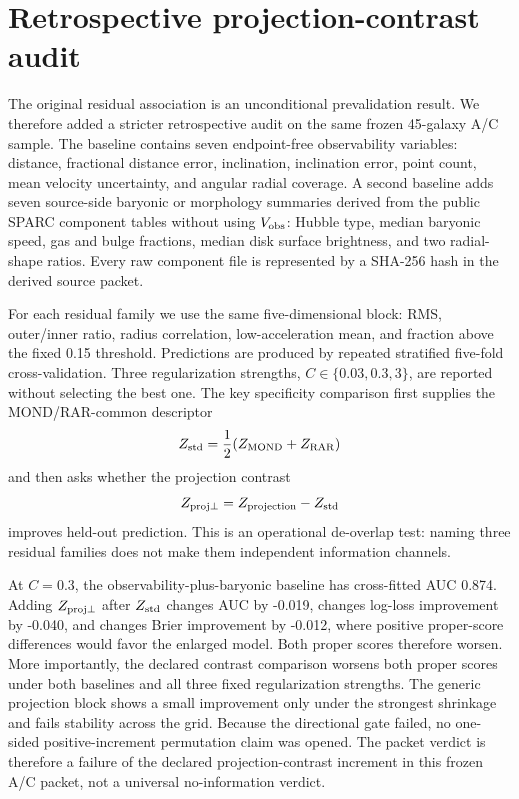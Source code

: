 \documentclass[11pt]{article}
\begin{document}
\section{Retrospective projection-contrast audit}

The original residual association is an unconditional prevalidation result. We therefore added a stricter retrospective audit on the same frozen 45-galaxy A/C sample. The baseline contains seven endpoint-free observability variables: distance, fractional distance error, inclination, inclination error, point count, mean velocity uncertainty, and angular radial coverage. A second baseline adds seven source-side baryonic or morphology summaries derived from the public SPARC component tables without using $V_{\rm obs}$: Hubble type, median baryonic speed, gas and bulge fractions, median disk surface brightness, and two radial-shape ratios. Every raw component file is represented by a SHA-256 hash in the derived source packet.

For each residual family we use the same five-dimensional block: RMS, outer/inner ratio, radius correlation, low-acceleration mean, and fraction above the fixed 0.15 threshold. Predictions are produced by repeated stratified five-fold cross-validation. Three regularization strengths, $C\in\{0.03,0.3,3\}$, are reported without selecting the best one. The key specificity comparison first supplies the MOND/RAR-common descriptor
\[
Z_{\rm std}=\frac{1}{2}(Z_{\rm MOND}+Z_{\rm RAR})
\]
and then asks whether the projection contrast
\[
Z_{\rm proj\perp}=Z_{\rm projection}-Z_{\rm std}
\]
improves held-out prediction. This is an operational de-overlap test: naming three residual families does not make them independent information channels.

At $C=0.3$, the observability-plus-baryonic baseline has cross-fitted AUC 0.874. Adding $Z_{\rm proj\perp}$ after $Z_{\rm std}$ changes AUC by -0.019, changes log-loss improvement by -0.040, and changes Brier improvement by -0.012, where positive proper-score differences would favor the enlarged model. Both proper scores therefore worsen. More importantly, the declared contrast comparison worsens both proper scores under both baselines and all three fixed regularization strengths. The generic projection block shows a small improvement only under the strongest shrinkage and fails stability across the grid. Because the directional gate failed, no one-sided positive-increment permutation claim was opened. The packet verdict is therefore a failure of the declared projection-contrast increment in this frozen A/C packet, not a universal no-information verdict.
\end{document}
